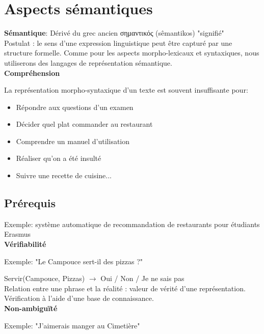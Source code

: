 \vspace{-1.2cm}

\section{Aspects sémantiques}

\textbf{Sémantique}: Dérivé du grec ancien \textgreek{σημαντικός} (sêmantikos) "signifié" \\

Postulat : le sens d'une expression linguistique peut être capturé par une structure formelle. Comme pour les aspects morpho-lexicaux et syntaxiques, nous utiliserons des langages de représentation sémantique.\\

\textbf{Compréhension}

La représentation morpho-syntaxique d'un texte est souvent insuffisante pour:

\begin{itemize}
    \item Répondre aux questions d'un examen
    \item Décider quel plat commander au restaurant
    \item Comprendre un manuel d'utilisation
    \item Réaliser qu'on a été insulté
    \item Suivre une recette de cuisine...
\end{itemize}

\subsection{Prérequis}

Exemple: système automatique de recommandation de restaurants pour étudiants Erasmus \\

\textbf{Vérifiabilité}

Exemple: "Le Campouce sert-il des pizzas ?"

Servir(Campouce, Pizzas) $\rightarrow$ Oui / Non / Je ne sais pas \\

Relation entre une phrase et la réalité : valeur de vérité d'une représentation. Vérification à l'aide d'une base de connaissance.\\

\textbf{Non-ambiguïté}

Exemple: "J'aimerais manger au Cimetière" \\

